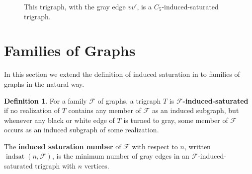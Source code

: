 \documentclass[12pt]{amsart}
\theoremstyle{plain}
\newtheorem{prop}[thm]{Proposition}
\theoremstyle{definition}
\newtheorem{defn}[thm]{Definition}
\theoremstyle{remark}
\newcommand{\indsat}[2]{\ensuremath{\operatorname{indsat}(#1,#2)}\xspace}
\newcommand{\sis}[2]{\ensuremath{{\operatorname{indsat}}^*(#1,#2)}\xspace}
\begin{document}


\begin{figure}[h]
\centering
{}%
\caption{This trigraph, with the gray edge $vv'$, is a $C_5$-induced-saturated trigraph.}
\label{fig:C5_10}
\end{figure}


%
%


\section{Families of Graphs}\label{sec:families}

In this section we extend the definition of induced saturation in \cite{MS} to families of graphs in the natural way.

\begin{defn}
For a family $\mathcal F$ of graphs, a trigraph $T$ is \textbf{$\mathcal F$-induced-saturated} if no realization of $T$ contains any member of $\mathcal F$ as an induced subgraph, but whenever any black or white edge of $T$ is turned to gray, some member of $\mathcal F$ occurs as an induced subgraph of some realization.

The \textbf{induced saturation number} of $\mathcal F$ with respect to $n$, written $\indsat{n}{\mathcal F}$, is the minimum number of gray edges in an $\mathcal{F}$-induced-saturated trigraph with $n$ vertices.
\end{defn}
\end{document}
